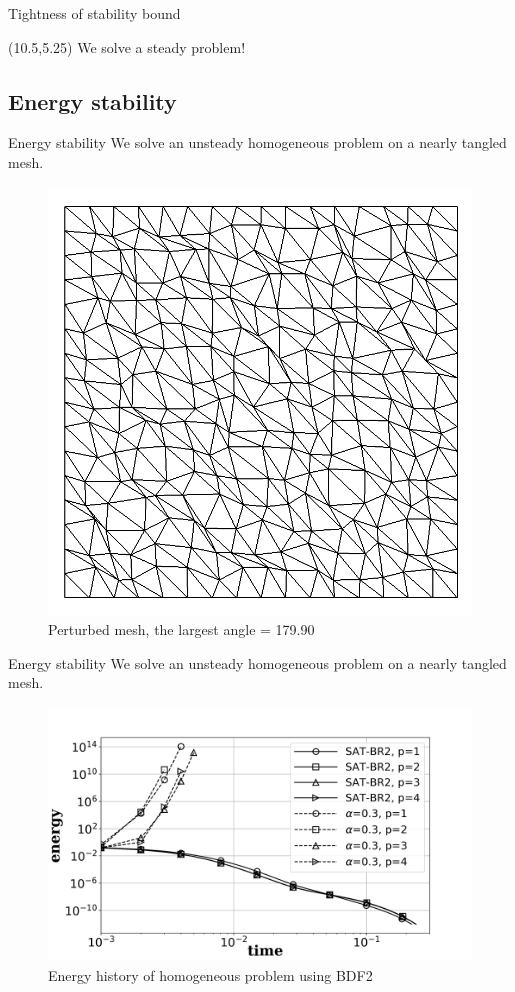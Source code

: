 \documentclass{beamer}
\begin{document}
\begin{frame}{Tightness of stability bound}
\begin{figure}
\begin{subfigure}{0.45\textwidth}
        \end{subfigure} 
    \end{figure}

    \begin{textblock}{3.5}(10.5,5.25)
        We solve a steady problem!
    \end{textblock}
\end{frame}

\subsection{Energy stability}

\begin{frame}{Energy stability}
    We solve an unsteady homogeneous problem on a nearly tangled mesh.
    \vskip -2mm
    \begin{figure} 
        \centering
        \includegraphics[width=0.45\linewidth]{figures/perturbed_mesh_16x16.png}
        \caption*{\footnotesize Perturbed mesh, the largest angle = 179.90\textdegree}
    \end{figure}
\end{frame}

\begin{frame}{Energy stability}
    We solve an unsteady homogeneous problem on a nearly tangled mesh.
    \vskip -2mm
    \begin{figure} 
        \centering
        \includegraphics[width=0.75\linewidth]{figures/energy_stability.png}
        \caption*{\footnotesize Energy history of homogeneous problem using BDF2}
    \end{figure}
\end{frame}
\end{document}
